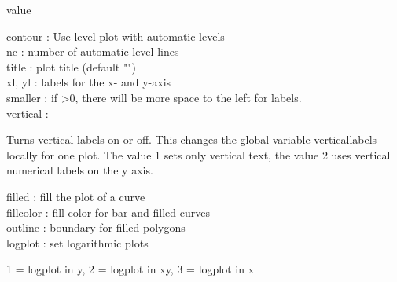 \documentclass[a4paper,10pt]{article}
\begin{document}
\begin{eulernotebook}
\begin{eulercomment}
\begin{eulercomment}
\begin{eulercomment}
\begin{eulercomment}
\begin{eulercomment}
\begin{eulercomment}
\begin{eulercomment}
\begin{eulercomment}
\begin{eulercomment}
\begin{eulercomment}
\begin{eulercomment}
\begin{eulercomment}
\begin{eulercomment}
\begin{eulercomment}
\begin{eulercomment}
\begin{eulercomment}
\begin{eulercomment}
\begin{eulercomment}
\begin{eulercomment}
\begin{eulercomment}
\begin{eulercomment}
\begin{eulercomment}
\begin{eulercomment}
\begin{eulercomment}
\begin{eulercomment}
\begin{eulercomment}
\begin{eulercomment}
\begin{eulercomment}
\begin{eulercomment}
\begin{eulercomment}
\begin{eulercomment}
\begin{eulercomment}
\begin{eulercomment}
\begin{eulercomment}
\begin{eulercomment}
\begin{eulercomment}
\begin{eulercomment}
\end{eulercomment}
\begin{eulerttcomment}
            value
\end{eulerttcomment}
\begin{eulercomment}
contour   : Use level plot with automatic levels\\
nc        : number of automatic level lines\\
title     : plot title (default "")\\
xl, yl    : labels for the x- and y-axis\\
smaller   : if \textgreater{}0, there will be more space to the left for labels.\\
vertical  :\\
\end{eulercomment}
\begin{eulerttcomment}
  Turns vertical labels on or off. This changes the global variable
  verticallabels locally for one plot. The value 1 sets only vertical
  text, the value 2 uses vertical numerical labels on the y axis.
\end{eulerttcomment}
\begin{eulercomment}
filled    : fill the plot of a curve\\
fillcolor : fill color for bar and filled curves\\
outline   : boundary for filled polygons\\
logplot   : set logarithmic plots\\
\end{eulercomment}
\begin{eulerttcomment}
            1 = logplot in y,
            2 = logplot in xy,
            3 = logplot in x
\end{eulerttcomment}

\end{eulercomment}
\end{eulercomment}
\end{eulercomment}
\end{eulercomment}
\end{eulercomment}
\end{eulercomment}
\end{eulercomment}
\end{eulercomment}
\end{eulercomment}
\end{eulercomment}
\end{eulercomment}
\end{eulercomment}
\end{eulercomment}
\end{eulercomment}
\end{eulercomment}
\end{eulercomment}
\end{eulercomment}
\end{eulercomment}
\end{eulercomment}
\end{eulercomment}
\end{eulercomment}
\end{eulercomment}
\end{eulercomment}
\end{eulercomment}
\end{eulercomment}
\end{eulercomment}
\end{eulercomment}
\end{eulercomment}
\end{eulercomment}
\end{eulercomment}
\end{eulercomment}
\end{eulercomment}
\end{eulercomment}
\end{eulercomment}
\end{eulercomment}
\end{eulercomment}
\end{eulernotebook}
\end{document}
